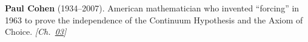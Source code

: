 \textbf{Paul Cohen} (1934–2007). American mathematician who invented ``forcing'' in 1963 to prove the independence of the Continuum Hypothesis and the Axiom of Choice. \emph{[Ch.~\hyperref[ch:banach]{03}]}

